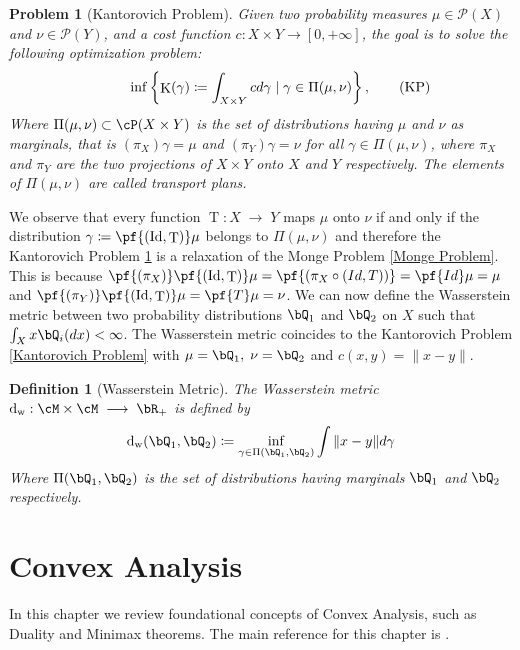 \documentclass[11pt,a4paper,oneside,openany]{book}
\DeclareMathOperator{\dw}{d_w}
\DeclareMathOperator{\T}{T}
\DeclareMathOperator{\KP}{KP}
\DeclareMathOperator{\K}{K}
\DeclareMathOperator{\Id}{Id}
\newtheorem{definition}{Definition}
\newtheorem{problem}{Problem}
\numberwithin{definition}{section}
\numberwithin{theorem}{section}
\numberwithin{problem}{section}
\newcommand{\la}{\; \longrightarrow \;}
\begin{document}
\begin{problem}[Kantorovich Problem]\label{Kantorovich Problem}
    Given two probability measures $\mu \in \mathcal{P}(X)$ and $\nu \in \mathcal{P}(Y)$, and a cost function $c:X\times Y \rightarrow [0,+\infty]$, the goal is to solve the following optimization problem:
    \begin{equation}
        \hspace{1cm} \inf\left\{ \K(\gamma) \coloneqq \int_{X \times Y}cd\gamma \mid \gamma \in \Pi(\mu,\nu)\right\}, \tag{$\KP$}
    \end{equation}
    Where $\Pi(\mu,\nu) \subset \cP(X\times Y)$ is the set of distributions having $\mu$ and $\nu$ as marginals, that is $(\pi_X)\gamma = \mu$ and $(\pi_Y)\gamma = \nu$ for all $\gamma \in \Pi(\mu,\nu)$, where $\pi_X$ and $\pi_Y$ are the two projections of $X \times Y$ onto $X$ and $Y$ respectively. The elements of $\Pi(\mu,\nu)$ are called \emph{transport plans}.
\end{problem}
We observe that every function $\T:X \la Y$ maps $\mu$ onto $\nu$ if and only if the distribution $\gamma \coloneqq \pf{(\Id ,\T)}\mu$ belongs to $\Pi(\mu,\nu)$ and therefore the Kantorovich Problem \ref{Kantorovich Problem} is a relaxation of the Monge Problem \ref{Monge Problem}. This is because $\pf{(\pi_X)}\pf{(\Id,\T)}\mu = \pf{(\pi_X \circ (Id,T))} = \pf{Id}\mu= \mu$ and $\pf{(\pi_Y)}\pf{(\Id,\T)}\mu = \pf{T}\mu = \nu$. We can now define the Wasserstein metric between two probability distributions $\bQ_1$ and $\bQ_2$ on $X$ such that $\int_X x \bQ_i(dx) < \infty$. The Wasserstein metric coincides to the Kantorovich Problem \eqref{Kantorovich Problem} with $\mu = \bQ_1,\; \nu = \bQ_2$ and $c(x,y) = \|x-y\|$.

\begin{definition}[Wasserstein Metric] \label{Wasserstein Metric}The Wasserstein metric $ \dw : \cM \times \cM \la \bR_+$ is defined by
\begin{equation}
    \dw(\bQ_1,\bQ_2) \coloneqq \inf_{\gamma \in \Pi(\bQ_1,\bQ_2)}{\int{\lVert x-y\rVert d\gamma} }
\end{equation}
Where $\Pi(\bQ_1,\bQ_2)$ is the set of distributions having marginals $\bQ_1$ and $\bQ_2$ respectively. 
\end{definition}





\section{Convex Analysis}
In this chapter we review foundational concepts of Convex Analysis, such as Duality and Minimax theorems. The main reference for this chapter is \cite{convexbook}.
\end{document}

